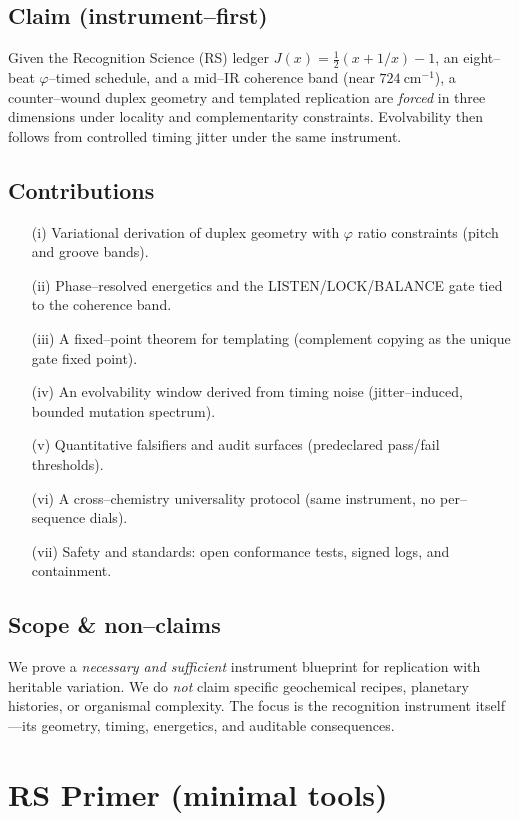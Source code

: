 \documentclass[11pt]{article}
\begin{document}
\subsection{Claim (instrument–first)}
Given the Recognition Science (RS) ledger \(J(x)=\tfrac12(x+1/x)-1\), an eight–beat \(\varphi\)–timed schedule, and a mid–IR coherence band (near \(724~\mathrm{cm^{-1}}\)), a counter–wound duplex geometry and templated replication are \emph{forced} in three dimensions under locality and complementarity constraints. Evolvability then follows from controlled timing jitter under the same instrument.

\subsection{Contributions}
\begin{enumerate}
\item[(i)] Variational derivation of duplex geometry with \(\varphi\) ratio constraints (pitch and groove bands).
\item[(ii)] Phase–resolved energetics and the LISTEN/LOCK/BALANCE gate tied to the coherence band.
\item[(iii)] A fixed–point theorem for templating (complement copying as the unique gate fixed point).
\item[(iv)] An evolvability window derived from timing noise (jitter–induced, bounded mutation spectrum).
\item[(v)] Quantitative falsifiers and audit surfaces (predeclared pass/fail thresholds).
\item[(vi)] A cross–chemistry universality protocol (same instrument, no per–sequence dials).
\item[(vii)] Safety and standards: open conformance tests, signed logs, and containment.
\end{enumerate}

\subsection{Scope \& non--claims}
We prove a \emph{necessary and sufficient} instrument blueprint for replication with heritable variation. We do \emph{not} claim specific geochemical recipes, planetary histories, or organismal complexity. The focus is the recognition instrument itself—its geometry, timing, energetics, and auditable consequences.

\section{RS Primer (minimal tools)}
\end{document}
